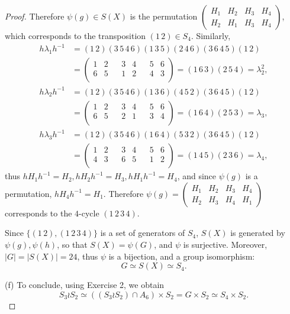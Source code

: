 \documentclass[11pt,a4paper]{article}
\begin{document}
\begin{proof}
Therefore $\psi(g) \in S(X)$ is the permutation 
$ 
\left(
\begin{array}{cccc}
H_1&H_2&H_3&H_4\\
H_2&H_1&H_3&H_4
\end{array}
\right)
$, which corresponds to the transposition $(1\,2) \in S_4$.
Similarly,
\begin{align*}
h\lambda_1h^{-1}&= (1\,2)(3\,5\,4\,6)(1\,3\,5)(2\,4\,6)(3\,6\,4\,5)(1\,2)\\
&=
\left(
\begin{array}{cccccccc}
1 & 2 & & 3 & 4 & & 5 & 6\\
 6&5&&1&2&&4&3 \\
  \end{array}
  \right) =(1\,6\,3)(2\,5\,4) = \lambda_2^2,\\
 h\lambda_2h^{-1} &= (1\,2)(3\,5\,4\,6)(1\,3\,6)(4\,5\,2)(3\,6\,4\,5)(1\,2)\\
 &=
 \left(
\begin{array}{cccccccc}
1 & 2 & & 3 & 4 & & 5 & 6\\
 6&5&&2&1&&3&4 \\
  \end{array}
  \right) = (1\,6\,4)(2\,5\,3) = \lambda_3,\\
   h\lambda_3h^{-1} &= (1\,2)(3\,5\,4\,6)(1\,6\,4)(5\,3\,2)(3\,6\,4\,5)(1\,2)\\
 &=
 \left(
\begin{array}{cccccccc}
1 & 2 & & 3 & 4 & & 5 & 6\\
 4&3&&6&5&&1&2 \\
  \end{array}
  \right) = (1\,4\,5)(2\,3\,6) = \lambda_4,
\end{align*}
thus $hH_1h^{-1} = H_2, hH_2h^{-1} = H_3, hH_1h^{-1} = H_4$, and since $\psi(g)$ is a permutation, $h H_4h^{-1} = H_1$. Therefore 
$\psi(g) = \left(
\begin{array}{cccc}
H_1&H_2&H_3&H_4\\
H_2&H_3&H_4&H_1
\end{array}
\right)
$
corresponds to the $4$-cycle $(1\,2 \,3 \,4)$. 

Since $\{(1\,2), (1\,2\,3\,4)\}$ is a set of generators of $S_4$, $S(X)$ is generated by $\psi(g), \psi(h)$, so that $S(X) = \psi(G)$, and $\psi$ is surjective. Moreover, $|G| = |S(X)| = 24$, thus $\psi$ is a bijection, and a group isomorphism:
$$G \simeq S(X) \simeq S_4.$$

\item[(f)] To conclude, using Exercise 2, we obtain
$$S_3\wr S_2 \simeq ((S_3 \wr S_2) \cap A_6) \times S_2  = G \times S_2 \simeq S_4 \times S_2.$$
\bigskip


\end{proof}
\end{document}

